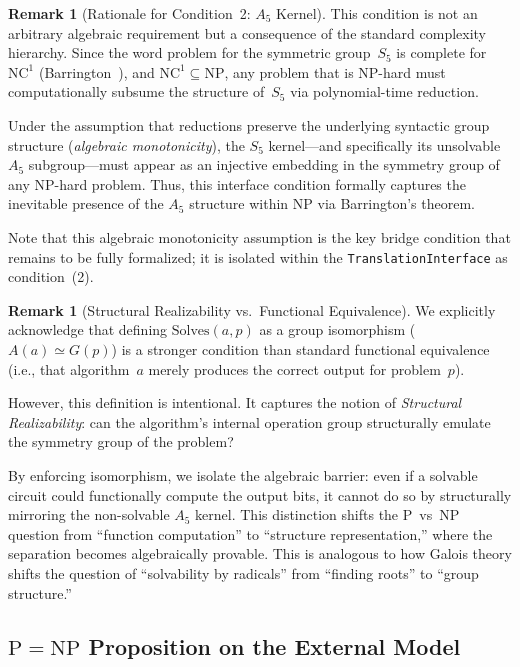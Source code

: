 \documentclass[11pt,a4paper]{article}
\theoremstyle{plain}
\theoremstyle{definition}
\newtheorem{remark}[theorem]{Remark}
\newcommand{\Aalt}{A_5}
\newcommand{\Sfive}{S_5}
\newcommand{\Solves}{\mathrm{Solves}}
\newcommand{\TranslationInterface}{\texttt{TranslationInterface}}
\begin{document}
\begin{remark}[Rationale for Condition~2: $\Aalt$ Kernel]\label{rem:a5rationale}
This condition is not an arbitrary algebraic requirement but a consequence of the standard complexity hierarchy. Since the word problem for the symmetric group~$\Sfive$ is complete for $\mathrm{NC}^1$ (Barrington~\cite{barrington1986}), and $\mathrm{NC}^1 \subseteq \mathrm{NP}$, any problem that is NP-hard must computationally subsume the structure of~$\Sfive$ via polynomial-time reduction.

Under the assumption that reductions preserve the underlying syntactic group structure (\emph{algebraic monotonicity}), the $\Sfive$ kernel---and specifically its unsolvable $\Aalt$ subgroup---must appear as an injective embedding in the symmetry group of any NP-hard problem. Thus, this interface condition formally captures the inevitable presence of the $\Aalt$ structure within NP via Barrington's theorem.

Note that this algebraic monotonicity assumption is the key bridge condition that remains to be fully formalized; it is isolated within the \TranslationInterface{} as condition~(2).
\end{remark}

\begin{remark}[Structural Realizability vs.\ Functional Equivalence]\label{rem:structural}
We explicitly acknowledge that defining $\Solves(a,p)$ as a group isomorphism ($A(a) \simeq G(p)$) is a stronger condition than standard functional equivalence (i.e., that algorithm~$a$ merely produces the correct output for problem~$p$).

However, this definition is intentional. It captures the notion of \emph{Structural Realizability}: can the algorithm's internal operation group structurally emulate the symmetry group of the problem?

By enforcing isomorphism, we isolate the algebraic barrier: even if a solvable circuit could functionally compute the output bits, it cannot do so by structurally mirroring the non-solvable $\Aalt$ kernel. This distinction shifts the P~vs~NP question from ``function computation'' to ``structure representation,'' where the separation becomes algebraically provable. This is analogous to how Galois theory shifts the question of ``solvability by radicals'' from ``finding roots'' to ``group structure.''
\end{remark}

\subsection{$\mathrm{P}=\mathrm{NP}$ Proposition on the External Model}
\end{document}
